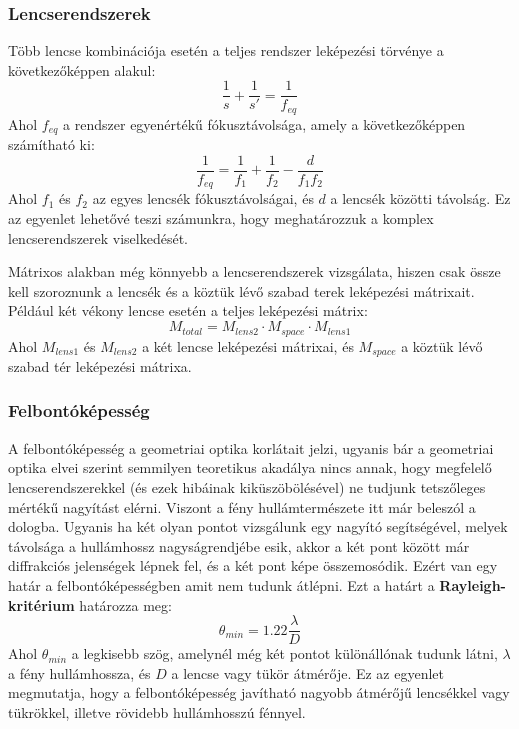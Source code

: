 \documentclass[a4paper,12pt]{article}
\begin{document}
\subsubsection*{Lencserendszerek}
Több lencse kombinációja esetén a teljes rendszer leképezési törvénye a következőképpen alakul:
\begin{equation}
    \frac{1}{s} + \frac{1}{s'} = \frac{1}{f_{eq}}
\end{equation}
Ahol $f_{eq}$ a rendszer egyenértékű fókusztávolsága, amely a következőképpen számítható ki:
\begin{equation}
    \frac{1}{f_{eq}} = \frac{1}{f_1} + \frac{1}{f_2} - \frac{d}{f_1 f_2}
\end{equation}
Ahol $f_1$ és $f_2$ az egyes lencsék fókusztávolságai, és $d$ a lencsék közötti távolság. Ez az egyenlet lehetővé teszi számunkra, hogy meghatározzuk a komplex lencserendszerek viselkedését.

Mátrixos alakban még könnyebb a lencserendszerek vizsgálata, hiszen csak össze kell szoroznunk a lencsék és a köztük lévő szabad terek leképezési mátrixait.
Például két vékony lencse esetén a teljes leképezési mátrix:
\begin{equation}
    M_{total} = M_{lens2} \cdot M_{space} \cdot M_{lens1}
\end{equation}
Ahol $M_{lens1}$ és $M_{lens2}$ a két lencse leképezési mátrixai, és $M_{space}$ a köztük lévő szabad tér leképezési mátrixa.

\subsubsection{Felbontóképesség}
A felbontóképesség a geometriai optika korlátait jelzi, ugyanis bár a geometriai optika elvei szerint semmilyen teoretikus akadálya nincs annak, hogy megfelelő lencserendszerekkel (és ezek hibáinak kiküszöbölésével)
ne tudjunk tetszőleges mértékű nagyítást elérni. Viszont a fény hullámtermészete itt már beleszól a dologba. Ugyanis ha két olyan pontot vizsgálunk egy nagyító segítségével,
melyek távolsága a hullámhossz nagyságrendjébe esik, akkor a két pont között már diffrakciós jelenségek lépnek fel, és a két pont képe összemosódik. Ezért van egy határ a felbontóképességben amit nem tudunk átlépni. Ezt a határt a \textbf{Rayleigh-kritérium} határozza meg:
\begin{equation}
    \theta_{min} = 1.22 \frac{\lambda}{D}
\end{equation}
Ahol $\theta_{min}$ a legkisebb szög, amelynél még két pontot különállónak tudunk látni, $\lambda$ a fény hullámhossza, és $D$ a lencse vagy tükör átmérője. Ez az egyenlet megmutatja, hogy a felbontóképesség
javítható nagyobb átmérőjű lencsékkel vagy tükrökkel, illetve rövidebb hullámhosszú fénnyel.
\end{document}
